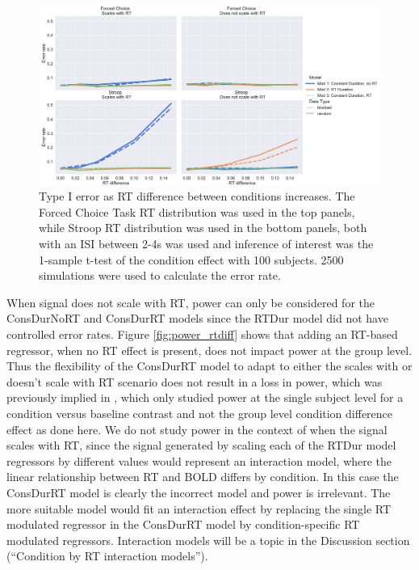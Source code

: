 \documentclass[titlepage,12pt] {article}
\begin{document}
\begin{figure}
  \centering
   \includegraphics[width=5in]{Figures/type1_err_24.pdf}
   \caption{Type I error as RT difference between conditions increases.  The Forced Choice Task RT distribution was used in the top panels, while Stroop RT distribution was used in the bottom panels, both with an ISI between 2-4s was used and inference of interest was the 1-sample t-test of the condition effect with 100 subjects.  2500 simulations were used to calculate the error rate.}
  \label{fig:type1err_24}
\end{figure}

When signal does not scale with RT, power can only be considered for the ConsDurNoRT and ConsDurRT models since the RTDur model did not have controlled error rates. Figure \ref{fig:power_rtdiff}  shows that adding an RT-based regressor, when no RT effect is present, does not impact power at the group level.  Thus the flexibility of the ConsDurRT model to adapt to either the scales with or doesn't scale with RT scenario does not result in a loss in power, which was previously implied in \citet{grinband_detection_2008}, which only studied power at the single subject level for a condition versus baseline contrast and not the group level condition difference effect as done here.  We do not study power in the context of when the signal scales with RT, since the signal generated by scaling each of the RTDur model regressors by different values would represent an interaction model, where the linear relationship between RT and BOLD differs by condition.  In this case the ConsDurRT model is clearly the incorrect model and power is irrelevant.  The more suitable model would fit an interaction effect by replacing the single RT modulated regressor in the ConsDurRT model by condition-specific RT modulated regressors.  Interaction models will be a topic in the Discussion section (``Condition by RT interaction models'').
\end{document}
